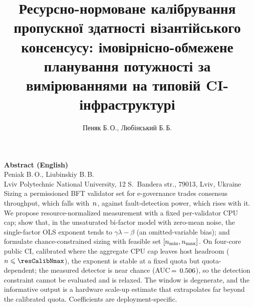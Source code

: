 \documentclass[12pt]{article}
\title[Ресурсно-нормоване калібрування пропускної здатності BFT-консенсусу]{Ресурсно-нормоване
калібрування пропускної здатності візантійського консенсусу: імовірнісно-обмежене
планування потужності за вимірюваннями на типовій CI-інфраструктурі}
\author[Пеняк Б.\,О.]{Пеняк Б.\,О., Любінський Б.\,Б.}
\begin{document}
\Ukrainian
\maketitle











\newpage
\English
\noindent\textbf{\Large Abstract (English)}\\[1ex]
Peniak B.\,O., Liubinskiy B.\,B.\\[0.5ex]
{\small Lviv Polytechnic National University,
12 S.~Bandera str., 79013, Lviv, Ukraine}\\[1.5ex]
Sizing a permissioned BFT validator set for \mbox{e-governance} trades
consensus throughput, which falls with~$n$, against fault-detection power,
which rises with it. We propose resource-normalized measurement with a fixed
per-validator CPU cap; show that, in the unsaturated bi-factor model with
zero-mean noise, the single-factor OLS exponent tends to
$\gamma\lambda-\beta$ (an \mbox{omitted-variable} bias); and formulate
chance-constrained sizing with feasible set $[\nmin,\nmax]$. On four-core
public CI, calibrated where the aggregate CPU cap leaves host headroom
($\n\le\resCalibNmax$), the exponent is stable at a fixed quota but
quota-dependent; the measured detector is near chance (AUC$\,=\,0.506$), so
the detection constraint cannot be evaluated and is relaxed. The window is
degenerate, and the informative output is a hardware scale-up estimate that
extrapolates far beyond the calibrated quota. Coefficients are
deployment-specific.
\end{document}
